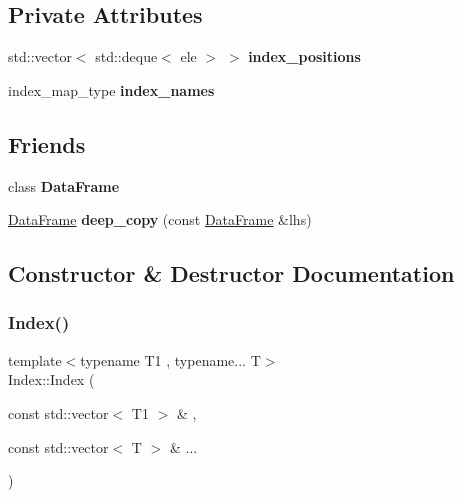 \subsection*{Private Attributes}
\begin{DoxyCompactItemize}
\item 
\mbox{\label{classIndex_a4aa36b9f2dca23c4525b30997515071c}} 
std\+::vector$<$ std\+::deque$<$ ele $>$ $>$ {\bfseries index\+\_\+positions}
\item 
\mbox{\label{classIndex_a8a1accb57950f7b0dc9fc4c5d3c33493}} 
index\+\_\+map\+\_\+type {\bfseries index\+\_\+names}
\end{DoxyCompactItemize}
\subsection*{Friends}
\begin{DoxyCompactItemize}
\item 
\mbox{\label{classIndex_ac3cf826bc43b8ab4740915b5c60e7166}} 
class {\bfseries Data\+Frame}
\item 
\mbox{\label{classIndex_ac665e1df1c1d41e0d0c5afcdfb827a74}} 
\hyperlink{classDataFrame}{Data\+Frame} {\bfseries deep\+\_\+copy} (const \hyperlink{classDataFrame}{Data\+Frame} \&lhs)
\end{DoxyCompactItemize}


\subsection{Constructor \& Destructor Documentation}
\mbox{\label{classIndex_a35f4948aa1ed7b87dc285cd56a64d24c}} 
\subsubsection{\texorpdfstring{Index()}{Index()}\hspace{0.1cm}{\footnotesize\ttfamily [1/2]}}
{\footnotesize\ttfamily template$<$typename T1 , typename... T$>$ \\
Index\+::\+Index (\begin{DoxyParamCaption}\item[{const std\+::vector$<$ T1 $>$ \&}]{,  }\item[{const std\+::vector$<$ T $>$ \&}]{... }\end{DoxyParamCaption})}



